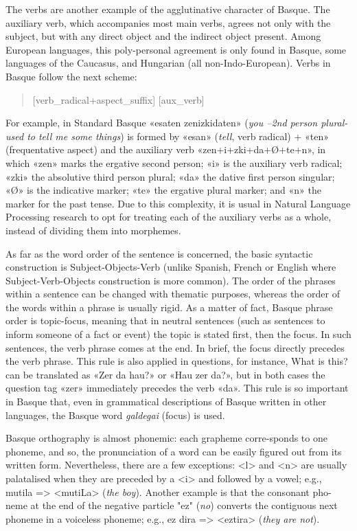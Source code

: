 \begin{multicols}{2}
The verbs are another example of the agglutinative character of Basque. The auxiliary verb, which accompanies most main verbs, agrees not only with the subject, but with any direct object and the indirect object present. Among European languages, this poly-personal agreement is only found in Basque, some languages of the Caucasus, and Hungarian (all non-Indo-European). Verbs in Basque follow the next scheme:

\begin{quote}
[verb\_radical+aspect\_suffix] [aux\_verb]
\end{quote}

For example, in Standard Basque «esaten zenizkidaten» (\textit{you –2nd person plural- used to tell me some things}) is formed by «esan» (\textit{tell}, verb radical) + «ten» (frequentative aspect) and the auxiliary verb «zen+i+zki+da+Ø+te+n», in which «zen» marks the ergative second person; «i» is the auxiliary verb radical; «zki» the absolutive third person plural; «da» the dative first person singular; «Ø» is the indicative marker; «te» the ergative plural marker; and «n» the marker for the past tense. Due to this complexity, it is usual in Natural Language Processing research to opt for treating each of the auxiliary verbs as a whole, instead of dividing them into morphemes.

As far as the word order of the sentence is concerned, the basic syntactic construction is Subject-Objects-Verb (unlike Spanish, French or English where Subject-Verb-Objects construction is more common). The order of the phrases within a sentence can be changed with thematic purposes, whereas the order of the words within a phrase is usually rigid. As a matter of fact, Basque phrase order is topic-focus, meaning that in neutral sentences (such as sentences to inform someone of a fact or event) the topic is stated first, then the focus. In such sentences, the verb phrase comes at the end. In brief, the focus directly precedes the verb phrase. This rule is also applied in questions, for instance, What is this? can be translated as «Zer da hau?» or «Hau zer da?», but in both cases the question tag «zer» immediately precedes the verb «da». This rule is so important in Basque that, even in grammatical descriptions of Basque written in other languages, the Basque word \textit{galdegai} (focus) is used.

Basque orthography is almost phonemic: each grapheme corre-sponds to one phoneme, and so, the pronunciation of a word can be easily figured out from its written form. Nevertheless, there are a few exceptions: <l> and <n> are usually palatalised when they are preceded by a <i> and followed by a vowel; e.g., mutila => <mutiLa> (\textit{the boy}). Another example is that the consonant pho-neme at the end of the negative particle "ez" (\textit{no}) converts the contiguous next phoneme in a voiceless phoneme; e.g., ez dira => <eztira> (\textit{they are not}). 


\end{multicols}
